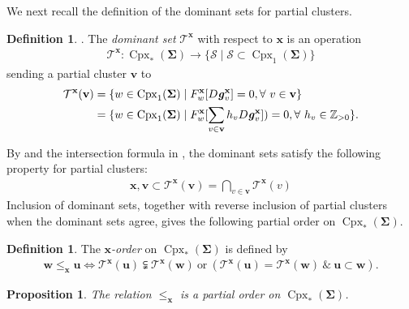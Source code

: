 \documentclass[11pt,reqno]{amsart}
\theoremstyle{plain}
\newtheorem{proposition}[theorem]{Proposition}
\theoremstyle{definition}
\newtheorem{definition}[theorem]{Definition}
\numberwithin{equation}{section}
\newcommand\hua{\mathcal}
\newcommand\ZZ{\mathbb{Z}}
\newcommand\<{\langle}
\renewcommand\>{\rangle}
\newcommand{\on}[1]{\operatorname{#1}}
\def\CCx{\on{Cpx}}   %
\def\ww{\mathbf{w}}
\def\vv{\mathbf{v}}
\def\uu{\mathbf{u}}
\newcommand{\bfit}[1]{\textbf{\textit{#1}}}
\def\seeds{\mathbf{\Sigma}}
\def\xx{\mathbf{x}}%
\def\gvec{\bfit{g}}
\def\Fpoly{{F}}
\newcommand{\ol}[1]{\overline{#1}}
\newcommand{\DT}[1]{#1^{\vee}}
\newcommand{\dom}[1]{\mathcal{T}^{#1}}
\newcommand{\cdom}[1]{\mathcal{F}^{#1}}
\begin{document}
We next recall the definition of the dominant sets for partial clusters.

\begin{definition}\label{def:dom}
\cite[Def.~7.3, Prop.~7.4(iii)]{Cao}.
The \emph{dominant set} $\dom{{\xx}}$ with respect to ${\xx}$ is an operation
\begin{gather}\label{dom}
    \dom{{\xx}}:\CCx_*(\seeds)\to%
    \{\hua{S}\mid\hua{S}\subset\CCx_1(\seeds)\}
\end{gather}
sending a partial cluster $\vv$ to
\begin{align}
    \dom{{\xx}}(\vv)
    &=\{
    w\in\CCx_1(\seeds) \mid \Fpoly^{{\xx}}_w[D\gvec^{{\xx}}_v]=0, \forall~v\in\vv
    \}\\
    &=
    \{
    w\in\CCx_1(\seeds) \mid \Fpoly^{{\xx}}_w[\sum_{v\in\vv} h_v D\gvec^{{\xx}}_v])=0, \forall~h_v\in\ZZ_{>0}
    \}.
\end{align}
\end{definition}

By \cite[Prop.~7.4]{Cao} and the intersection formula in , the dominant sets satisfy the following property for partial clusters:
\begin{gather}\label{eq:dom}
    {\xx},\vv\subset\dom{{\xx}}(\vv)=\bigcap_{v\in\vv}\dom{{\xx}}(v)
\end{gather}
 Inclusion
of dominant sets, together with reverse inclusion of partial clusters when the dominant sets agree, gives the following partial order on  $\CCx_*(\seeds)$.

\begin{definition}
The \emph{${\xx}$-order} on $\CCx_*(\seeds)$ is defined by
\begin{gather}
    \ww\le_{{\xx}}\uu\iff\dom{\xx}(\uu)\subsetneqq\dom{\xx}(\ww)~\text{or}~(\dom{\xx}(\uu)=\dom{\xx}(\ww)~\&~\uu\subset\ww).
\end{gather}
\end{definition}

\begin{proposition}
The relation $\le_{\xx}$ is a partial order on $\CCx_*(\seeds)$.
\end{proposition}
\end{document}
